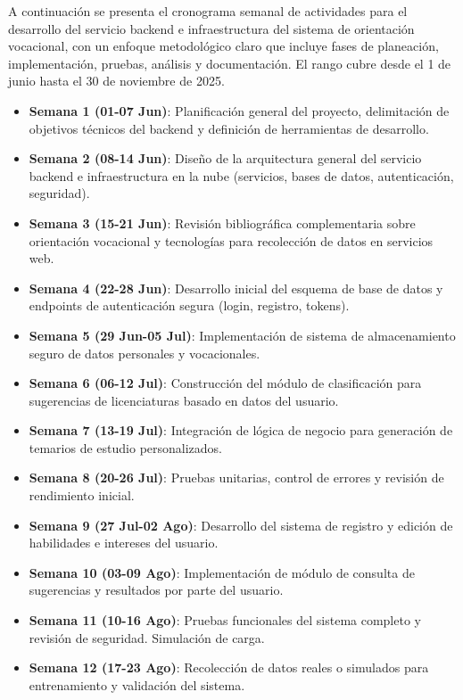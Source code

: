 A continuación se presenta el cronograma semanal de actividades para el desarrollo del servicio backend e infraestructura del sistema de orientación vocacional, con un enfoque metodológico claro que incluye fases de planeación, implementación, pruebas, análisis y documentación. El rango cubre desde el 1 de junio hasta el 30 de noviembre de 2025.

\begin{itemize}
  \item \textbf{Semana 1 (01-07 Jun)}: Planificación general del proyecto, delimitación de objetivos técnicos del backend y definición de herramientas de desarrollo.
  \item \textbf{Semana 2 (08-14 Jun)}: Diseño de la arquitectura general del servicio backend e infraestructura en la nube (servicios, bases de datos, autenticación, seguridad).
  \item \textbf{Semana 3 (15-21 Jun)}: Revisión bibliográfica complementaria sobre orientación vocacional y tecnologías para recolección de datos en servicios web.
  \item \textbf{Semana 4 (22-28 Jun)}: Desarrollo inicial del esquema de base de datos y endpoints de autenticación segura (login, registro, tokens).
  \item \textbf{Semana 5 (29 Jun-05 Jul)}: Implementación de sistema de almacenamiento seguro de datos personales y vocacionales.
  \item \textbf{Semana 6 (06-12 Jul)}: Construcción del módulo de clasificación para sugerencias de licenciaturas basado en datos del usuario.
  \item \textbf{Semana 7 (13-19 Jul)}: Integración de lógica de negocio para generación de temarios de estudio personalizados.
  \item \textbf{Semana 8 (20-26 Jul)}: Pruebas unitarias, control de errores y revisión de rendimiento inicial.
  \item \textbf{Semana 9 (27 Jul-02 Ago)}: Desarrollo del sistema de registro y edición de habilidades e intereses del usuario.
  \item \textbf{Semana 10 (03-09 Ago)}: Implementación de módulo de consulta de sugerencias y resultados por parte del usuario.
  \item \textbf{Semana 11 (10-16 Ago)}: Pruebas funcionales del sistema completo y revisión de seguridad. Simulación de carga.
  \item \textbf{Semana 12 (17-23 Ago)}: Recolección de datos reales o simulados para entrenamiento y validación del sistema.

\end{itemize}
